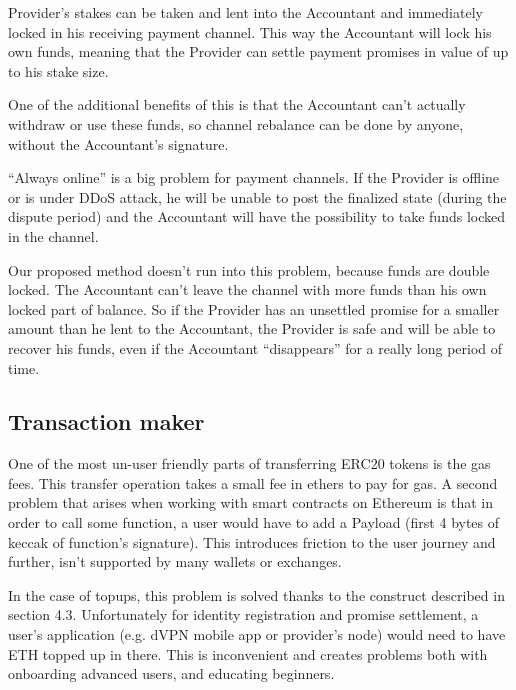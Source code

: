\documentclass[a4paper,12pt]{article}
\begin{document}
Provider’s stakes can be taken and lent into the Accountant and immediately locked
in his receiving payment channel. This way the Accountant will lock his own funds, 
meaning that the Provider can settle payment promises in value of up to his stake 
size.

One of the additional benefits of this is that the Accountant can’t actually 
withdraw or use these funds, so channel rebalance can be  done by anyone, without 
the Accountant’s signature.

“Always online” is a big problem for payment channels. If the Provider is offline 
or is under DDoS attack, he will be unable to post the finalized state (during the 
dispute period) and the Accountant will have the possibility to take funds locked 
in the channel.

Our proposed method doesn’t run into this problem, because funds are double locked. 
The Accountant can’t leave the channel with more funds than his own locked part of 
balance. So if the Provider has an unsettled promise for a smaller amount than he 
lent to the Accountant, the Provider is safe and will be able to recover his funds, 
even if the Accountant “disappears” for a really long period of time.

\subsection{Transaction maker}

One of the most un-user friendly parts of transferring ERC20 tokens is the gas 
fees. This transfer operation takes a small fee in ethers to pay for gas. A second
problem that arises when working with smart contracts on Ethereum is that in order 
to call some function, a user would have to add a Payload (first 4 bytes of keccak 
of function’s signature). This introduces friction to the user journey and further, 
isn’t supported by many wallets or exchanges.

In the case of topups, this problem is solved thanks to the construct described in 
section 4.3. Unfortunately for identity registration and promise settlement, a 
user’s application (e.g. dVPN mobile app or provider’s node) would need to have ETH
topped up in there. This is inconvenient and creates problems both with onboarding 
advanced users, and educating beginners.
\end{document}
